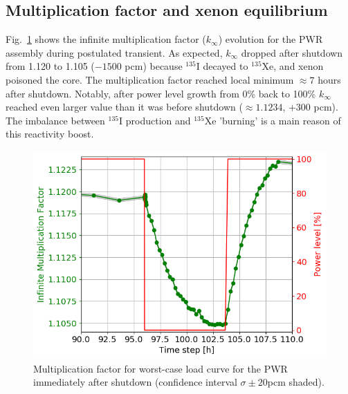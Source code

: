 \documentclass{anstrans}
\begin{document}
\subsection{Multiplication factor and xenon equilibrium}
Fig.~\ref{fig:pwr_keff} shows the infinite multiplication factor 
($k_{\infty}$) evolution for the \gls{PWR} assembly during postulated 
transient. As expected, $k_{\infty}$ dropped  after shutdown from 1.120 to 
1.105 ($-1500$ pcm) because $^{135}$I decayed to $^{135}$Xe, and xenon 
poisoned the core. The multiplication factor reached local minimum  
$\approx7$ hours after shutdown. Notably, after power level growth from 
0\% back to 100\% 
$k_{\infty}$ reached even larger value than it was before shutdown ($\approx 
1.1234$, $+300$ pcm). The imbalance between $^{135}$I production and 
$^{135}$Xe 'burning' is a main reason of this reactivity boost.
\begin{figure}[htbp!] %
	\centering
	\includegraphics[width=1.06\linewidth]{pwr_keff_zoomed.png}
	\caption{Multiplication factor for worst-case load curve for the \gls{PWR} 
	immediately after shutdown (confidence interval $\sigma\pm20$pcm shaded).}
	\label{fig:pwr_keff}
\end{figure}
\end{document}
